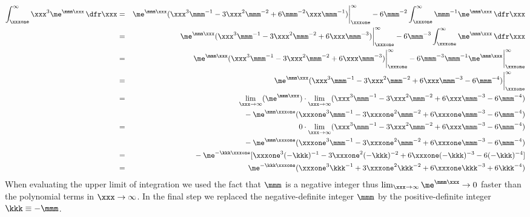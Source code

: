 \documentclass[12pt]{article}
\begin{document}
\begin{eqnarray}
\int_{\xxxone}^{\infty} \xxx^{3}\me^{\mmm\xxx} \,\dfr\xxx  
& = &
\me^{\mmm\xxx}(\xxx^{3}\mmm^{-1} - 3\xxx^{2}\mmm^{-2} + 6\mmm^{-2}\xxx\mmm^{-1}) \bigg|_{\xxxone}^{\infty} - 6\mmm^{-2} \int_{\xxxone}^{\infty} \mmm^{-1}\me^{\mmm\xxx} \,\dfr\xxx \nonumber \\
& = &
\me^{\mmm\xxx}(\xxx^{3}\mmm^{-1} - 3\xxx^{2}\mmm^{-2} + 6\xxx\mmm^{-3}) \bigg|_{\xxxone}^{\infty} - 6\mmm^{-3} \int_{\xxxone}^{\infty} \me^{\mmm\xxx} \,\dfr\xxx \nonumber \\
& = &
\me^{\mmm\xxx}(\xxx^{3}\mmm^{-1} - 3\xxx^{2}\mmm^{-2} + 6\xxx\mmm^{-3}) \bigg|_{\xxxone}^{\infty} - 6\mmm^{-3} \mmm^{-1} \me^{\mmm\xxx} \bigg|_{\xxxone}^{\infty} \nonumber \\
& = &
\me^{\mmm\xxx}(\xxx^{3}\mmm^{-1} - 3\xxx^{2}\mmm^{-2} + 6\xxx\mmm^{-3} - 6\mmm^{-4}) \bigg|_{\xxxone}^{\infty} \nonumber \\
& = &
\lim_{\xxx \rightarrow \infty} ( \me^{\mmm\xxx} ) \cdot 
\lim_{\xxx \rightarrow \infty} (\xxx^{3}\mmm^{-1} - 3\xxx^{2}\mmm^{-2} + 6\xxx\mmm^{-3} - 6\mmm^{-4}) \nonumber \\
& &
{} - \me^{\mmm\xxxone}(\xxxone^{3}\mmm^{-1} - 3\xxxone^{2}\mmm^{-2} + 6\xxxone\mmm^{-3} - 6\mmm^{-4}) \nonumber \\
& = &
0 \cdot \lim_{\xxx \rightarrow \infty} (\xxx^{3}\mmm^{-1} - 3\xxx^{2}\mmm^{-2} + 6\xxx\mmm^{-3} - 6\mmm^{-4}) \nonumber \\
& &
{} - \me^{\mmm\xxxone}(\xxxone^{3}\mmm^{-1} - 3\xxxone^{2}\mmm^{-2} + 6\xxxone\mmm^{-3} - 6\mmm^{-4}) \nonumber \\
& = &
{} - \me^{-\kkk\xxxone}[\xxxone^{3}(-\kkk)^{-1} - 3\xxxone^{2}(-\kkk)^{-2} + 6\xxxone(-\kkk)^{-3} - 6(-\kkk)^{-4}] \nonumber \\
& = &
\me^{-\kkk\xxxone}(\xxxone^{3}\kkk^{-1} + 3\xxxone^{2}\kkk^{-2} + 6\xxxone\kkk^{-3} + 6\kkk^{-4})
\label{eqn:srs_ntg_itr3}
\end{eqnarray}
When evaluating the upper limit of integration we used the fact that $\mmm$ is a negative integer thus 
$\lim_{\xxx \rightarrow \infty} \me^{\mmm\xxx} \rightarrow 0$ faster than the polynomial terms in $\xxx \rightarrow \infty$. 
In the final step we replaced the negative-definite integer $\mmm$ by the positive-definite integer $\kkk \equiv -\mmm$.
\end{document}
